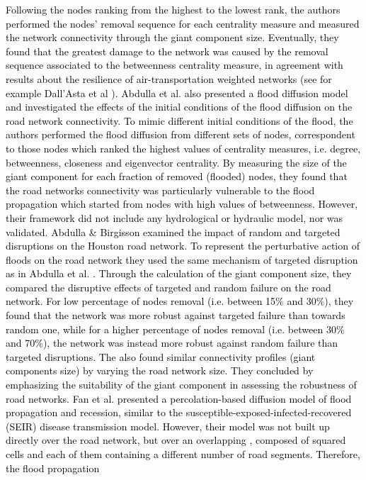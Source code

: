 \documentclass[twocolumn,fleqn,10pt]{wlscirep}
\begin{document}
\textcolor{black}{Following}
\textcolor{black}{the nodes ranking from the highest to the lowest rank, the authors performed the nodes' removal sequence for each centrality measure and measured the network connectivity through the giant component size. Eventually, they found that the greatest damage to the network was caused by the removal sequence associated to the betweenness centrality measure,}
\textcolor{black}{
in agreement with results about the resilience of air-transportation weighted networks (see for example Dall'Asta et al \cite{DallAsta2006}).}
\textcolor{black}{
Abdulla et al. \cite{Abdulla2020_SIS} also presented a flood diffusion model and investigated the effects of the initial conditions of the flood diffusion on the road network connectivity. To mimic different initial conditions of the flood, the authors performed the flood diffusion from different sets of nodes, correspondent to those nodes which ranked the highest values of centrality measures, i.e. degree, betweenness, closeness and eigenvector centrality. By measuring the size of the giant component for each fraction of removed (flooded) nodes, they found that the road networks connectivity was particularly vulnerable to the flood propagation which started from nodes with high values of betweenness. 
\textcolor{black}{
However, their framework did not include any hydrological or hydraulic model, nor was validated.}
Abdulla \& Birgisson \cite{Abdulla2021} examined the impact of random and targeted disruptions on the Houston road network. To represent the perturbative action of floods on the road network they used the same mechanism of targeted disruption as in Abdulla et al. \cite{Abdulla2019_conference_paper}. Through the calculation of the giant component size, 
\textcolor{black}{
they compared the disruptive effects of targeted and random failure on the road network. For low percentage of nodes removal (i.e. between 15\% and 30\%), they found that the network was more robust against targeted failure than towards random one, while for a higher percentage of nodes removal (i.e. between 30\% and 70\%), the network was instead more robust against random failure than targeted disruptions.}
The also found similar connectivity profiles (giant components size) by varying the road network size. They 
\textcolor{black}{concluded by emphasizing}
the suitability of the giant component in assessing the robustness of road networks.
Fan et al. \cite{Fan2020} presented a percolation-based diffusion model of flood propagation and recession, similar to the susceptible-exposed-infected-recovered (SEIR) disease transmission model. However, their model was not built up directly over the road network, but over an overlapping , composed of squared cells and each of them containing a different number of road segments. Therefore, the flood propagation 
}
\end{document}
